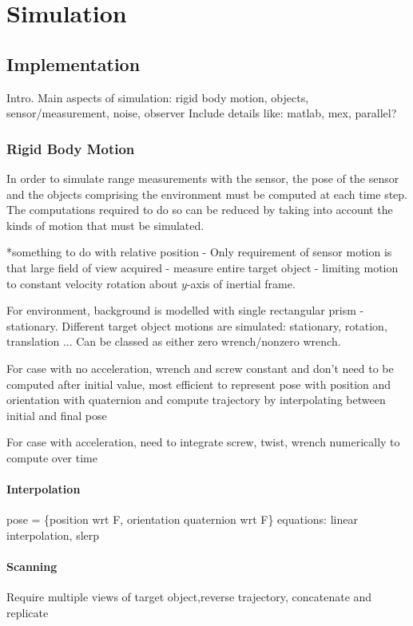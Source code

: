 \chapter{Simulation}
\section{Implementation}
Intro. Main aspects of simulation: rigid body motion, objects, sensor/measurement, noise, observer
Include details like: matlab, mex, parallel?

\subsection{Rigid Body Motion}
In order to simulate range measurements with the sensor, the pose of the sensor and the objects comprising the environment must be computed at each time step. The computations required to do so can be reduced by taking into account the kinds of motion that must be simulated.

*something to do with relative position - Only requirement of sensor motion is that large field of view acquired - measure entire target object - limiting motion to constant velocity rotation about $y$-axis of inertial frame.

For environment, background is modelled with single rectangular prism - stationary.
Different target object motions are simulated: stationary, rotation, translation ... Can be classed as either zero wrench/nonzero wrench.

For case with no acceleration, wrench and screw constant and don't need to be computed after initial value, most efficient to represent pose with position and orientation with quaternion and compute trajectory by interpolating between initial and final pose

For case with acceleration, need to integrate screw, twist, wrench numerically to compute over time 

\subsubsection{Interpolation}
pose = \{position wrt F, orientation quaternion wrt F\}
equations: linear interpolation, slerp

\subsubsection{Scanning}
Require multiple views of target object,reverse trajectory, concatenate and replicate

